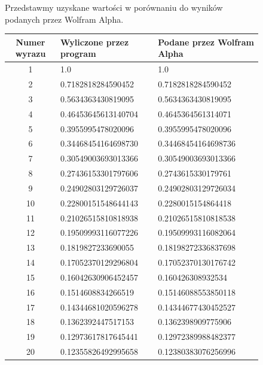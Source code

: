 \documentclass[11pt,wide]{article}
\begin{document}
\begin{figure}[h!]
Przedstawmy uzyskane wartości w porównaniu do wyników podanych przez Wolfram Alpha.
\begin{center}
  \begin{tabular}{ | c | l | l | }
  \hline
  Numer wyrazu & Wyliczone przez program & Podane przez Wolfram Alpha \\ \hline
  	1 & {\color{green}1.0} & {\color{green}1.0} \\
	2 & {\color{green}0.7182818284590452} & {\color{green}0.7182818284590452} \\
	3 & {\color{green}0.5634363430819095} & {\color{green}0.5634363430819095} \\
	4 & {\color{green}0.464536456131407}04 & {\color{green}0.464536456131407}1 \\
	5 & {\color{green}0.3955995478020096} & {\color{green}0.3955995478020096} \\
	6 & {\color{green}0.3446845416469873}0 & {\color{green}0.3446845416469873}6 \\
	7 & {\color{green}0.30549003693013366} & {\color{green}0.30549003693013366} \\
	8 & {\color{green}0.274361533017976}06 & {\color{green}0.274361533017976}1 \\
	9 & {\color{green}0.2490280312972603}7 & {\color{green}0.2490280312972603}4 \\
	10 & {\color{green}0.228001515486441}43 & {\color{green}0.228001515486441}8 \\
	11 & {\color{green}0.21026515810818}938 & {\color{green}0.21026515810818}538 \\
	12 & {\color{green}0.195099931160}77226 & {\color{green}0.195099931160}82064 \\
	13 & {\color{green}0.18198272336}90055 & {\color{green}0.18198272336}837698 \\
	14 & {\color{green}0.170523701}29296804 & {\color{green}0.170523701}30176742 \\
	15 & {\color{green}0.16042630}906452457 & {\color{green}0.16042630}8932534 \\
	16 & {\color{green}0.15146088}34266519 & {\color{green}0.15146088}553850118 \\
	17 & {\color{green}0.143446}81020596278 & {\color{green}0.143446}77430452527 \\
	18 & {\color{green}0.136239}2447517153 & {\color{green}0.136239}8909775906 \\
	19 & {\color{green}0.1297}3617817645441 & {\color{green}0.1297}2389988482377 \\
	20 & {\color{green}0.123}55826492995658 & {\color{green}0.123}80383076256996 \\
	\hline
  \end{tabular}
\end{center}
\end{figure}
\end{document}

